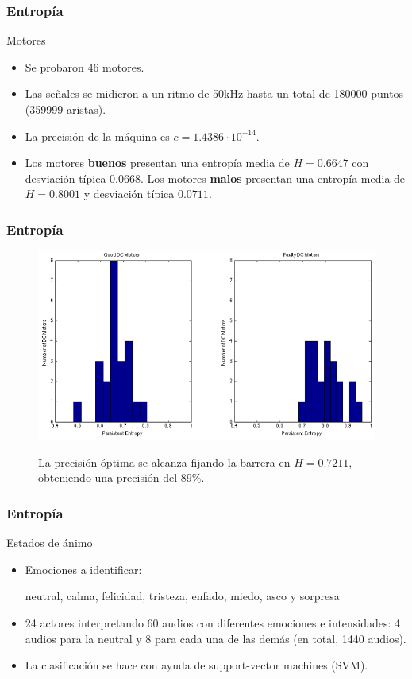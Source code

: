 \documentclass{beamer}
\begin{document}
\begin{frame}


\frametitle{Entropía}

\begin{block}{Motores}
\begin{itemize}
\item<2-> Se probaron 46 motores.
\item<3-> Las señales se midieron a un ritmo de 50kHz hasta un total de 180000 puntos (359999 aristas).
\item<4-> La precisión de la máquina es $c=1.4386\cdot 10^{-14}$.
\item<5-> Los motores \textbf{buenos} presentan una entropía media de $H=0.6647$ con desviación típica $0.0668$. Los motores \textbf{malos} presentan una entropía media de $H=0.8001$ y desviación típica $0.0711$.

\end{itemize}

\end{block}

\end{frame}




\begin{frame}
\frametitle{Entropía}
\begin{figure}[h!]
\centering
\includegraphics[scale=0.5]{motors}

La precisión óptima se alcanza fijando la barrera en $H=0.7211$, obteniendo una precisión del $89\%$. 
\end{figure}
\end{frame}


\begin{frame}
\frametitle{Entropía}
\begin{block}{Estados de ánimo}
\begin{itemize}
\item<2-> Emociones a identificar:

neutral, calma, felicidad, tristeza, enfado, miedo, asco y sorpresa
\item<3-> 24 actores interpretando 60 audios con diferentes emociones e intensidades: 4 audios para la neutral y 8 para cada una de las demás (en total, 1440 audios).
\item<4-> La clasificación se hace con ayuda de support-vector machines (SVM).
\end{itemize}
\end{block}
\end{frame}
\end{document}
